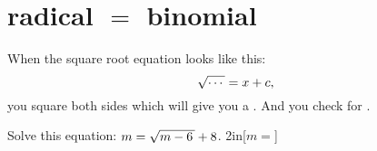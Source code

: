 \section{radical $=$ binomial}

\begin{tcolorbox}[center,width=5.25in,colback=white]
    When the square root equation looks like this:
    {
    \[
        \myRoot{\cdots} = x + c\text{,}
    \]
    }%
    you {square} {both} {sides} 
    which will give you a .
    And you  check for  .
\end{tcolorbox}

\myWideProblem
{
    Solve this equation: \quad $m = \myRoot{m-6} +8$.
}{2in}[\raggedleft$m=$]